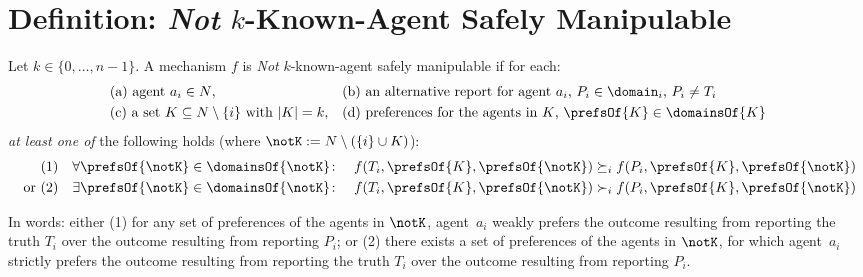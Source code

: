 \section{Definition: \emph{Not} $k$-Known-Agent Safely Manipulable}\label{apx:not-KNAM}

\begin{definition}
    Let $k \in \{0,\ldots, n-1\}$. A mechanism $f$ is \emph{Not} $k$-known-agent safely manipulable if for each:
    \begin{align*}
        &\text{(a) agent~$a_i \in N$},  && \text{(b) an alternative report for agent~$a_i$, $P_i \in \domain_i$,  $P_i\neq T_i$}\\
        &\text{(c) a set $K \subseteq N \setminus \{i\}$ with $|K| = k$}, &&\text{(d) preferences for the agents in $K$, $\prefsOf{K} \in \domainsOf{K}$}
    \end{align*}
    \emph{at least one of} the following holds (where $\notK :=  N \setminus (\{i\} \cup K)$):
    \begin{align*}
            &(1) \quad \forall \prefsOf{\notK} \in \domainsOf{\notK} \colon \quad f(T_i,\prefsOf{K}, \prefsOf{\notK}) 
 \succeq_i f(P_i,\prefsOf{K}, \prefsOf{\notK}) \\
            \text{ or } &(2)\quad   \exists \prefsOf{\notK} \in \domainsOf{\notK} \colon \quad   f(T_i,\prefsOf{K}, \prefsOf{\notK})  \succ_i f(P_i,\prefsOf{K}, \prefsOf{\notK})
    \end{align*}
\end{definition}

In words: either (1) for any set of preferences of the agents in $\notK$, agent~$a_i$ weakly prefers the outcome resulting from reporting the truth $T_i$ over the outcome resulting from reporting $P_i$; or (2) there exists a set of preferences of the agents in $\notK$, for which agent~$a_i$ strictly prefers the outcome resulting from reporting the truth $T_i$ over the outcome resulting from reporting $P_i$.